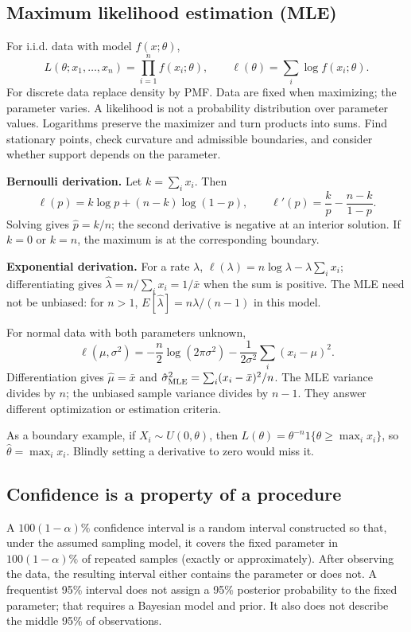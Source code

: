 \subsection{Maximum likelihood estimation (MLE)}
For i.i.d. data with model $f(x;\theta)$,
\[
L(\theta;x_1,\ldots,x_n)=\prod_{i=1}^nf(x_i;\theta),\qquad
\ell(\theta)=\sum_i\log f(x_i;\theta).
\]
For discrete data replace density by PMF. Data are fixed when maximizing;
the parameter varies. A likelihood is not a probability distribution over
parameter values. Logarithms preserve the maximizer and turn products into
sums. Find stationary points, check curvature and admissible boundaries,
and consider whether support depends on the parameter.

\textbf{Bernoulli derivation.} Let $k=\sum_i x_i$. Then
\[
\ell(p)=k\log p+(n-k)\log(1-p),\qquad
\ell'(p)=\frac kp-\frac{n-k}{1-p}.
\]
Solving gives $\hat p=k/n$; the second derivative is negative at an interior
solution. If $k=0$ or $k=n$, the maximum is at the corresponding boundary.

\textbf{Exponential derivation.} For a rate $\lambda$,
$\ell(\lambda)=n\log\lambda-\lambda\sum_i x_i$; differentiating gives
$\hat\lambda=n/\sum_i x_i=1/\bar x$ when the sum is positive.
The MLE need not be unbiased: for $n>1$,
$E[\hat\lambda]=n\lambda/(n-1)$ in this model.

For normal data with both parameters unknown,
\[
\ell(\mu,\sigma^2)=-\frac n2\log(2\pi\sigma^2)
-\frac1{2\sigma^2}\sum_i(x_i-\mu)^2.
\]
Differentiation gives $\hat\mu=\bar x$ and
$\hat\sigma^2_{\rm MLE}=\sum_i(x_i-\bar x)^2/n$.
The MLE variance divides by $n$; the unbiased sample variance divides by
$n-1$. They answer different optimization or estimation criteria.

As a boundary example, if $X_i\sim U(0,\theta)$, then
$L(\theta)=\theta^{-n}1\{\theta\geq\max_i x_i\}$, so
$\hat\theta=\max_i x_i$. Blindly setting a derivative to zero would miss it.

\subsection{Confidence is a property of a procedure}
A $100(1-\alpha)\%$ confidence interval is a random interval constructed so
that, under the assumed sampling model, it covers the fixed parameter in
$100(1-\alpha)\%$ of repeated samples (exactly or approximately).
After observing the data, the resulting interval either contains the
parameter or does not. A frequentist 95\% interval does not assign a 95\%
posterior probability to the fixed parameter; that requires a Bayesian
model and prior. It also does not describe the middle 95\% of observations.

